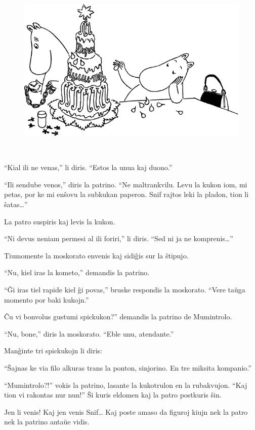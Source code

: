 \begin{figure}[htbp]
\centering
\includegraphics[width=400pt,height=245pt]{9-1.png}
\caption{}
\label{9-1}
\end{figure}

``Kial ili ne venas,'' li diris. ``Estos la unua kaj duono.''

``Ili sendube venos,'' diris la patrino. ``Ne maltrankvilu. Levu la kukon iom, mi petas, por ke mi enŝovu la subkukan paperon. Snif rajtos leki la pladon, tion li ŝatas{\ldots}''

La patro suspiris kaj levis la kukon.

``Ni devus neniam permesi al ili foriri,'' li diris. ``Sed ni ja ne komprenis{\ldots}''

Tiumomente la moskorato envenis kaj sidiĝis sur la ŝtipujo.

``Nu, kiel iras la kometo,'' demandis la patrino.

``Ĝi iras tiel rapide kiel ĝi povas,'' bruske respondis la moskorato. ``Vere taŭga momento por baki kukojn.''

Ĉu vi bonvolus gustumi spickukon?'' demandis la patrino de Mumintrolo.

``Nu, bone,'' diris la moskorato. ``Eble unu, atendante.''

Manĝinte tri spickukojn li diris:

``Ŝajnas ke via filo alkuras trans la ponton, sinjorino. En tre miksita kompanio.''

``Mumintrolo?!'' vokis la patrino, lasante la kukotrulon en la rubakvujon. ``Kaj tion vi rakontas nur nun!'' Ŝi kuris eldomen kaj la patro postkuris ŝin.

Jen li venis! Kaj jen venis Snif{\ldots} Kaj poste amaso da figuroj kiujn nek la patro nek la patrino antaŭe vidis.


